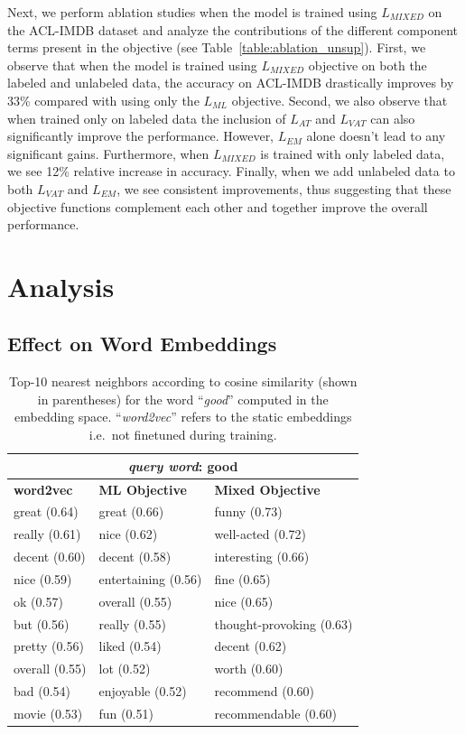 \documentclass[letterpaper]{article}
\begin{document}
Next, we perform ablation studies when the model is trained using $L_{\textit{MIXED}}$ on the ACL-IMDB dataset and analyze the contributions of the different component terms present in the objective (see Table~\ref{table:ablation_unsup}). First, we observe that when the model is trained using $L_{\textit{MIXED}}$ objective on both the labeled and unlabeled data, the accuracy on ACL-IMDB drastically improves by 33\% compared with using only the $L_{\textit{ML}}$ objective. Second, we also observe that when trained only on labeled data the inclusion of $L_{\textit{AT}}$ and $L_{\textit{VAT}}$ can also significantly improve the performance. However, $L_{\textit{EM}}$ alone doesn't lead to any significant gains. Furthermore, when $L_{\textit{MIXED}}$ is trained with only labeled data, we see 12\% relative increase in accuracy. Finally, when we add unlabeled data to both $L_{\textit{VAT}}$ and $L_{\textit{EM}}$, we see consistent improvements, thus suggesting that these objective functions complement each other and together improve the overall performance.

\section{Analysis}                        \label{sec:analysis}

\subsection{Effect on Word Embeddings}
\begin{table}[!htb]
\small
\centering
\begin{tabular}{@{}l | l | l@{}}
\toprule
\multicolumn{3}{c}{\emph{query word}: good} \\
\midrule
\textbf{word2vec} & \textbf{ML Objective} & \textbf{Mixed Objective} \\
\midrule
great (0.64) & great (0.66) & funny (0.73) \\
really (0.61) & nice (0.62) & well-acted (0.72) \\
decent (0.60) & decent (0.58) & interesting (0.66) \\
nice (0.59) & entertaining (0.56) & fine (0.65) \\
ok (0.57) & overall (0.55) & nice (0.65) \\
but (0.56) & really (0.55) & thought-provoking (0.63) \\
pretty (0.56) & liked (0.54) & decent (0.62) \\
overall (0.55) & lot (0.52) & worth (0.60) \\
bad (0.54) & enjoyable (0.52) & recommend (0.60) \\
movie (0.53) & fun (0.51) & recommendable (0.60) \\
\bottomrule
\end{tabular}
\caption{Top-10 nearest neighbors according to cosine similarity (shown in parentheses) for the word ``\emph{good}'' computed in the embedding space. ``\emph{word2vec}'' refers to the static embeddings i.e.\ not finetuned during training.}
\label{table:t-sne}
\end{table}
\end{document}
